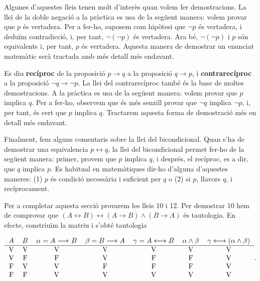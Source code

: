 Algunes d'aquestes lleis tenen molt d'interès quan volem fer
demostracions. La llei de la doble negació a la pràctica es usa de
la següent manera: volem provar que $p$ és vertadera. Per a fer-ho,
suposem com hipòtesi que $\lnot p$ és vertadera, i deduïm
contradicció, i, per tant, $\lnot\left( \lnot p\right) $ és
vertadera. Ara bé, $\lnot\left( \lnot p\right) $ i $p$ són
equivalents i, per tant, $p$ és vertadera. Aquesta manera de demostrar
un enunciat matemàtic serà tractada amb més detall més
endavant.

\bigskip

Es diu \textbf{recíproc} de la proposició $p\longrightarrow q$ a la
proposició $q\longrightarrow p$, i \textbf{contrarecíproc} a la
proposició $\lnot q\longrightarrow\lnot p$. La llei del contrarecíproc també és la base de moltes demostracions. A la pràctica es
usa de la següent manera: volem provar que $p$ implica $q$. Per a
fer-ho, observem que és més senzill provar que $\lnot q$ implica $\lnot p$, i, per tant, és cert que $p$ implica $q$. Tractarem aquesta
forma de demostració més en detall més endavant.

\bigskip

Finalment, fem alguns comentaris sobre la llei del bicondicional. Quan s'ha
de demostrar una equivalencia $p\longleftrightarrow q$, la llei del
bicondicional permet fer-ho de la següent manera: primer, provem que $p$
implica $q$, i després, el recíproc, es a dir, que $q$ implica $p$.
Es habitual en matemàtiques dir-ho d'alguna d'aquestes maneres: (1) $p$
és condició necessària i suficient per $q$ o (2) si $p$, llavors
$q$, i recíprocament.

\bigskip

Per a completar aquesta secció provarem les lleis 10 i 12. Per demostrar
10 hem de comprovar que $\left( A\longleftrightarrow B\right)
\longleftrightarrow\left( A\longrightarrow B\right) \wedge\left(
B\longrightarrow A\right) $ és tautologia. En efecte, constriuïm la
matriu i s'obté tautologia

\begin{equation*}
\begin{tabular}{ccccccc}
$A$ & $B$ & $\alpha=A$ $\longrightarrow$ $B$ & $\beta=B\longrightarrow A$ & $\gamma=A\longleftrightarrow B$ & $\alpha\wedge\beta$ & $\gamma
\longleftrightarrow\left( \alpha\wedge\beta\right) $ \\ \hline
V & V & V & V & V & V & V \\
V & F & F & V & F & F & V \\
F & V & V & F & F & F & V \\
F & F & V & V & V & V & V\end{tabular}
\text{.}
\end{equation*}

